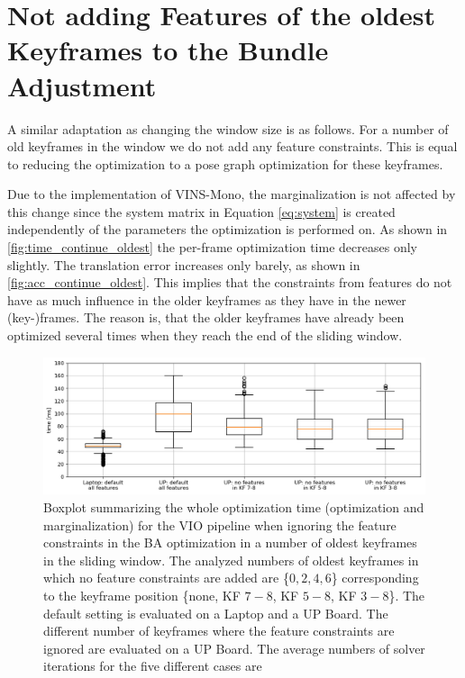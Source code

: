 \begin{minipage}[b]{1\linewidth}
\section{Not adding Features of the oldest Keyframes to the Bundle Adjustment} 
\label{sec:dontOptimizeOldest}
A similar adaptation as changing the window size is as follows. For a number of 
old keyframes in the window we do not add any feature constraints. This is 
equal to reducing the optimization to a pose graph optimization for these 
keyframes.

Due to the implementation of VINS-Mono, the marginalization is not 
affected by this change since the system matrix in Equation \eqref{eq:system} is 
created independently of the parameters the optimization is performed on. As 
shown in \autoref{fig:time_continue_oldest} 
the per-frame optimization time decreases only slightly. The translation error 
increases only barely, as shown in \autoref{fig:acc_continue_oldest}.
This implies that the constraints from 
features do not have as much influence in the older keyframes as they have in 
the newer (key-)frames. The reason is, that the older keyframes have already 
been optimized several times when they reach the end of the sliding window. 
\begin{figure}[H]
\centering
\includegraphics[width=1\textwidth]{images/time_continue_oldest}
\caption{Boxplot summarizing the whole optimization time (optimization and 
marginalization) for the \ac{VIO} pipeline when ignoring the feature 
constraints in the \ac{BA} optimization in a number of oldest keyframes in the 
sliding window. The analyzed numbers of oldest keyframes in which no feature 
constraints are added are \{$0, 2, 4, 6$\} corresponding to the keyframe 
position \{none, KF $7\!-\!8$, KF $5\!-\!8$, KF $3\!-\!8$\}. The default 
setting is evaluated on a Laptop and a UP Board. The different number of 
keyframes where the feature constraints are ignored are evaluated on a UP 
Board. The average numbers of solver iterations for the five different cases are 
}
\end{figure}
\end{minipage}

